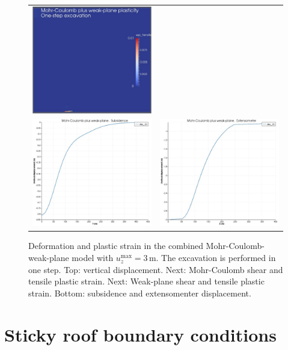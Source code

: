 \documentclass[]{scrreprt}
\begin{document}
\begin{figure}[p]
\begin{center}
\begin{tabular}{cc}
\includegraphics[width=6cm]{mc_wp_one_step_wp_tensile.pdf} \\
\includegraphics[width=6cm]{mc_wp_one_step_subsidence.pdf} &
\includegraphics[width=6cm]{mc_wp_one_step_extensometer.pdf}
\end{tabular}
\caption{Deformation and plastic strain in the combined Mohr-Coulomb-weak-plane model with
  $u_{z}^{\mathrm{max}} = 3$\,m.  The excavation is performed in one step.  Top:
  vertical displacement.  Next: Mohr-Coulomb shear and tensile plastic
  strain.  Next: Weak-plane shear and tensile plastic strain.
  Bottom: subsidence and extensomenter displacement.}
\label{mc_wp.one_step}
\end{center}
\end{figure}


\chapter{Sticky roof boundary conditions}
\end{document}
